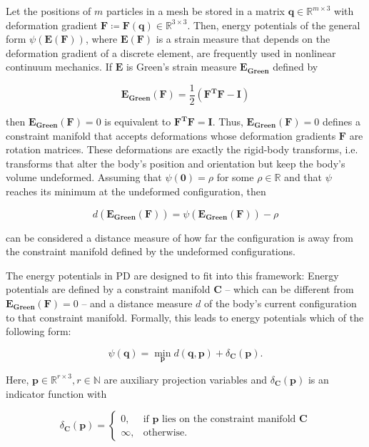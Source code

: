 Let the positions of $m$ particles in a mesh be stored in a matrix $\bm{q} \in \mathbb{R}^{m \times 3}$ with deformation gradient $\bm{F} 
\coloneqq \bm{F(\bm{q})} \in \mathbb{R}^{3 \times 3}$. Then, energy potentials of the general form $\psi(\bm{E}(\bm{F}))$, where 
$\bm{E}(\bm{F})$ is a strain measure that depends on the deformation gradient of a discrete element, are frequently used in nonlinear 
continuum mechanics. If $\bm{E}$ is Green's strain measure $\bm{E_{\text{Green}}}$ defined by 

\[
\bm{E_{\text{Green}}}(\bm{F}) = \frac{1}{2}(\bm{F^TF} - \bm{I})
\]

\noindent then $\bm{E_{\text{Green}}}(\bm{F}) = 0$ is equivalent to $\bm{F^TF} = \bm{I}$. Thus, $\bm{E_{\text{Green}}}(\bm{F}) = 0$ defines a constraint
manifold that accepts deformations whose deformation gradients $\bm{F}$ are rotation matrices. These deformations are exactly the rigid-body 
transforms, i.e. transforms that alter the body's position and orientation but keep the body's volume undeformed. Assuming that $\psi(\bm{0}) 
= \rho$ for some $\rho \in \mathbb{R}$ and that $\psi$ reaches its minimum at the undeformed configuration, then 

\[
    d(\bm{E_{\text{Green}}}(\bm{F})) = \psi(\bm{E_{\text{Green}}}(\bm{F})) - \rho
\]

\noindent can be considered a distance measure of how far the configuration is away from the constraint manifold defined by the undeformed 
configurations. 

The energy potentials in PD are designed to fit into this framework: Energy potentials are defined by a constraint manifold $\bm{C}$ -- which 
can be different from $\bm{E_{\text{Green}}(\bm{F})} = 0$ -- and a distance measure $d$ of the body's current configuration to that constraint 
manifold. Formally, this leads to energy potentials which of the 
following form:

\[
    \psi({\bm{q}}) = \min_{\bm{p}} d(\bm{q}, \bm{p}) + \delta_{\bm{C}}(\bm{p}).
\]

\noindent Here, $\bm{p} \in \mathbb{R}^{r \times 3}, r \in \mathbb{N}$ are auxiliary projection variables and $\delta_{\bm{C}}(\bm{p})$ is an indicator function with 

\[
    \delta_{\bm{C}}(\bm{p})= 
\begin{cases}
0,& \text{if } \bm{p} \text{ lies on the constraint manifold } \bm{C}\\
\infty,& \text{otherwise.}
\end{cases}
\]

